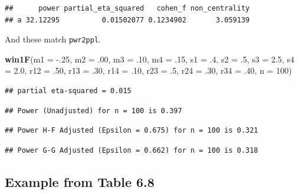 \documentclass[]{book}
\newenvironment{Shaded}{\begin{snugshade}}{\end{snugshade}}
\newcommand{\DataTypeTok}[1]{\textcolor[rgb]{0.13,0.29,0.53}{#1}}
\newcommand{\DecValTok}[1]{\textcolor[rgb]{0.00,0.00,0.81}{#1}}
\newcommand{\FloatTok}[1]{\textcolor[rgb]{0.00,0.00,0.81}{#1}}
\newcommand{\KeywordTok}[1]{\textcolor[rgb]{0.13,0.29,0.53}{\textbf{#1}}}
\newcommand{\NormalTok}[1]{#1}
\begin{document}
\begin{verbatim}
##      power partial_eta_squared   cohen_f non_centrality
## a 32.12295          0.01502077 0.1234902       3.059139
\end{verbatim}

And these match \texttt{pwr2ppl}.

\begin{Shaded}
\begin{Highlighting}[]
\KeywordTok{win1F}\NormalTok{(}\DataTypeTok{m1 =} \FloatTok{-.25}\NormalTok{, }\DataTypeTok{m2 =} \FloatTok{.00}\NormalTok{, }\DataTypeTok{m3 =} \FloatTok{.10}\NormalTok{, }\DataTypeTok{m4 =} \FloatTok{.15}\NormalTok{,}
      \DataTypeTok{s1 =} \FloatTok{.4}\NormalTok{, }\DataTypeTok{s2 =} \FloatTok{.5}\NormalTok{, }\DataTypeTok{s3 =} \FloatTok{2.5}\NormalTok{, }\DataTypeTok{s4 =} \FloatTok{2.0}\NormalTok{,}
      \DataTypeTok{r12 =} \FloatTok{.50}\NormalTok{, }\DataTypeTok{r13 =} \FloatTok{.30}\NormalTok{, }\DataTypeTok{r14 =} \FloatTok{.10}\NormalTok{,}
      \DataTypeTok{r23 =} \FloatTok{.5}\NormalTok{, }\DataTypeTok{r24 =} \FloatTok{.30}\NormalTok{, }\DataTypeTok{r34 =} \FloatTok{.40}\NormalTok{,}
      \DataTypeTok{n =} \DecValTok{100}\NormalTok{)}
\end{Highlighting}
\end{Shaded}

\begin{verbatim}
## partial eta-squared = 0.015
\end{verbatim}

\begin{verbatim}
## Power (Unadjusted) for n = 100 is 0.397
\end{verbatim}

\begin{verbatim}
## Power H-F Adjusted (Epsilon = 0.675) for n = 100 is 0.321
\end{verbatim}

\begin{verbatim}
## Power G-G Adjusted (Epsilon = 0.662) for n = 100 is 0.318
\end{verbatim}

\hypertarget{example-from-table-6.8}{%
\subsection{Example from Table 6.8}\label{example-from-table-6.8}}
\end{document}
